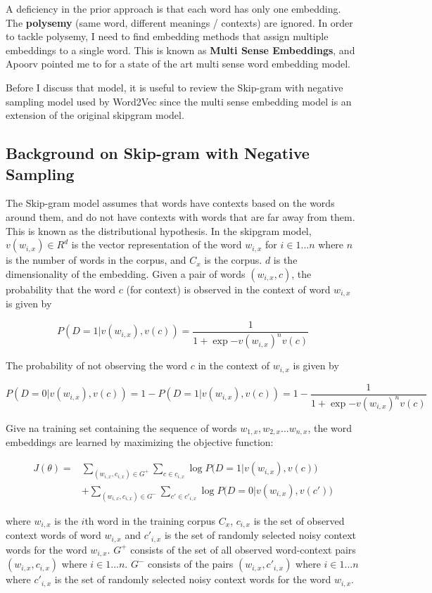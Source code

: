 A deficiency in the prior approach is that each word has only one embedding. The \textbf{polysemy} (same word, different meanings / contexts) are ignored. In order to tackle polysemy, I need to find embedding methods that assign multiple embeddings to a single word. This is known as \textbf{Multi Sense Embeddings}, and Apoorv pointed me to \cite{neelakantan2015efficient} for a state of the art multi sense word embedding model.

Before I discuss that model, it is useful to review the Skip-gram with negative sampling model used by Word2Vec since the multi sense embedding model is an extension of the original skipgram model.

\subsection{Background on Skip-gram with Negative Sampling}

The Skip-gram model assumes that words have contexts based on the words around them, and do not have contexts with words that are far away from them. This is known as the distributional hypothesis. In the skipgram model, $v(w_{i, x}) \in R^d$ is the vector representation of the word $w_{i, x}$ for $i \in 1 ... n$ where $n$ is the number of words in the corpus, and $C_x$ is the corpus. $d$ is the dimensionality of the embedding. Given a pair of words $(w_{i, x}, c)$, the probability that the word $c$ (for context) is observed in the context of word $w_{i, x}$ is given by

\[ P(D = 1 | v(w_{i, x}), v(c)) = \frac{1}{1+\exp{-v(w_{i, x})^n v(c)}}\]

The probability of not observing the word $c$ in the context of $w_{i, x}$ is given by

\[ P(D = 0 | v(w_{i, x}), v(c)) = 1 - P(D = 1 | v(w_{i, x}), v(c)) = 1 - \frac{1}{1+\exp{-v(w_{i, x})^n v(c)}}\]

Give na training set containing the sequence of words $w_{1, x}, w_{2,x} ... w_{n, x}$, the word embeddings are learned by maximizing the objective function:

\begin{align*}
J(\theta) = &\sum_{(w_{i, x}, c_{i, x}) \in G^+} \sum_{c \in c_{i, x}} \log{P(D=1 | v(w_{i,x}), v(c)})\\
&+ \sum_{(w_{i, x}, c_{i, x}) \in G^-} \sum_{c' \in c'_{i, x}} \log{P(D=0 | v(w_{i,x}), v(c')})
\end{align*}

where $w_{i, x}$ is the $i$th word in the training corpus $C_x$, $c_{i, x}$ is the set of observed context words of word $w_{i, x}$ and $c'_{i, x}$ is the set of randomly selected noisy context words for the word $w_{i, x}$. $G^+$ consists of the set of all observed word-context pairs $(w_{i, x}, c_{i, x})$ where $i \in 1 ... n$. $G^-$ consists of the pairs $(w_{i,x}, c'_{i, x})$ where $i \in 1 ... n$ where $c'_{i, x}$ is the set of randomly selected noisy context words for the word $w_{i, x}$.

